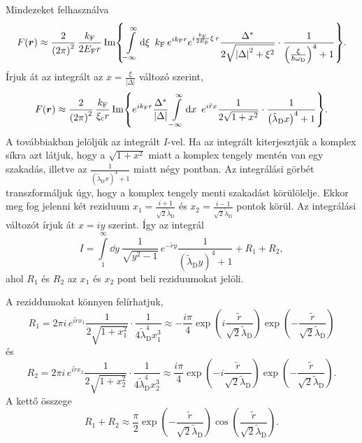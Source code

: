 \documentclass[a4paper,12pt,titlepage]{article}
\newcommand{\RR}{{\vb*{r}}}
\newcommand{\kF}{{k_\text{F}}}
\newcommand{\EF}{{E_\text{F}}}
\begin{document}
Mindezeket felhasználva
\begin{equation}
	F(\RR) \approx \frac{2}{\left( 2 \pi \right)^2} \, \frac{\kF}{2 \EF r} \Im{ \int\limits_{-\infty}^\infty \dd{\xi} ~ \kF \, e^{i \kF r} e^{i \frac{\kF}{2 \EF} \xi \, r} \frac{\Delta^*}{2 \sqrt{\left| \Delta \right|^2 + \xi^2}} \cdot \frac{1}{\left( \frac{\xi}{\hbar \omega_\text{D}} \right)^4 + 1} }.
\end{equation}
Írjuk át az integrált az $x = \frac{\xi}{\left| \Delta \right|}$ változó szerint,
\begin{equation} \label{f-def}
	F(\RR) \approx \frac{2}{\left( 2 \pi \right)^2} \, \frac{\kF}{\xi_\text{c} r} \Im{ e^{i \kF r} \frac{\Delta^*}{\left| \Delta \right|} \int\limits_{-\infty}^\infty \dd{x} ~ e^{i \tilde{r} x} \frac{1}{2 \sqrt{1 + x^2}} \cdot \frac{1}{\left( \tilde{\lambda}_\text{D} x \right)^4 + 1} }.
\end{equation}
A továbbiakban jelöljük az integrált $I$-vel.  Ha az integrált kiterjesztjük a komplex síkra azt látjuk, hogy a $\sqrt{1 + x^2}$ miatt a komplex tengely mentén van egy szakadás, illetve az $\frac{1}{\left( \tilde{\lambda}_\text{D} x \right)^4 + 1}$ miatt négy pontban.  Az integrálási görbét transzformáljuk úgy, hogy a komplex tengely menti szakadást körülölelje.  Ekkor meg fog jelenni két reziduum $x_1 = \frac{i + 1}{\sqrt{2} \tilde{\lambda}_\text{D}}$ és $x_2 = \frac{i - 1}{\sqrt{2} \tilde{\lambda}_\text{D}}$ pontok körül.  Az integrálási változót írjuk át $x = i y$ szerint.  Így az integrál
\begin{equation}
	I = \int\limits_1^\infty \dd{y} ~ \frac{1}{\sqrt{y^2 - 1}} \, e^{-\tilde{r} y} \frac{1}{\left( \tilde{\lambda}_\text{D} y \right)^4 + 1} + R_1 + R_2,
\end{equation}
ahol $R_1$ és $R_2$ az $x_1$ és $x_2$ pont beli reziduumokat jelöli.

A reziddumokat könnyen felírhatjuk,
\begin{equation}
	R_1 = 2 \pi i \, e^{i \tilde{r} x_1} \frac{1}{2 \sqrt{1 + x_1^2}} \cdot \frac{1}{4 \tilde{\lambda}_\text{D}^4 x_1^3} \approx -\frac{i \pi}{4} \exp(i \frac{\tilde{r}}{\sqrt{2} \tilde{\lambda}_\text{D}}) \exp(-\frac{\tilde{r}}{\sqrt{2} \tilde{\lambda}_\text{D}})
\end{equation}
és
\begin{equation}
	R_2 = 2 \pi i \, e^{i \tilde{r} x_2} \frac{1}{2 \sqrt{1 + x_2^2}} \cdot \frac{1}{4 \tilde{\lambda}_\text{D}^4 x_2^3} \approx \frac{i \pi}{4} \exp(-i \frac{\tilde{r}}{\sqrt{2} \tilde{\lambda}_\text{D}}) \exp(-\frac{\tilde{r}}{\sqrt{2} \tilde{\lambda}_\text{D}}).
\end{equation}
A kettő összege
\begin{equation}
	R_1 + R_2 \approx \frac{\pi}{2} \exp(-\frac{\tilde{r}}{\sqrt{2} \tilde{\lambda}_\text{D}}) \cos(\frac{\tilde{r}}{\sqrt{2} \tilde{\lambda}_\text{D}}).
\end{equation}
\end{document}
